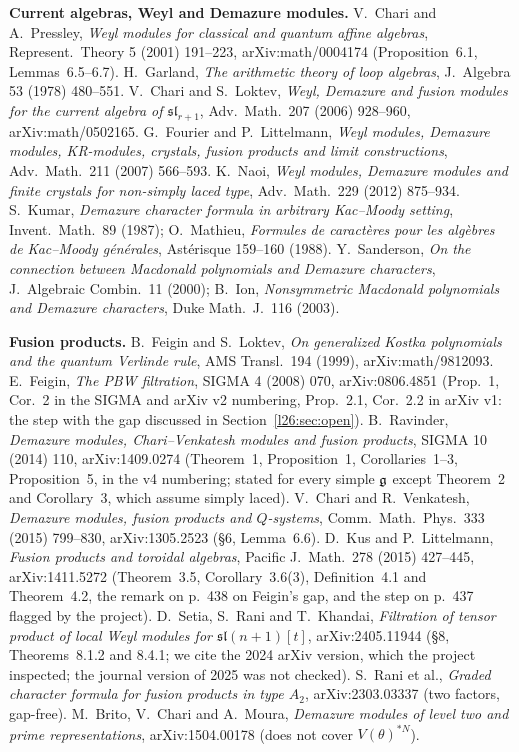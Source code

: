 \textbf{Current algebras, Weyl and Demazure modules.} V.~Chari and A.~Pressley, \emph{Weyl modules for classical and quantum affine
algebras}, Represent.\ Theory 5 (2001) 191--223, arXiv:math/0004174 (Proposition~6.1, Lemmas~6.5--6.7). H.~Garland, \emph{The arithmetic
theory of loop algebras}, J.\ Algebra 53 (1978) 480--551. V.~Chari and S.~Loktev, \emph{Weyl, Demazure and fusion modules for the current
algebra of $\mathfrak{sl}_{r+1}$}, Adv.\ Math.\ 207 (2006) 928--960, arXiv:math/0502165. G.~Fourier and P.~Littelmann, \emph{Weyl modules,
Demazure modules, KR-modules, crystals, fusion products and limit constructions}, Adv.\ Math.\ 211 (2007) 566--593. K.~Naoi, \emph{Weyl modules,
Demazure modules and finite crystals for non-simply laced type}, Adv.\ Math.\ 229 (2012) 875--934. S.~Kumar, \emph{Demazure character formula in
arbitrary Kac--Moody setting}, Invent.\ Math.\ 89 (1987); O.~Mathieu, \emph{Formules de caract\`eres pour les alg\`ebres de Kac--Moody
g\'en\'erales}, Ast\'erisque 159--160 (1988). Y.~Sanderson, \emph{On the connection between Macdonald polynomials and Demazure characters}, J.\
Algebraic Combin.\ 11 (2000); B.~Ion, \emph{Nonsymmetric Macdonald polynomials and Demazure characters}, Duke Math.\ J.\ 116 (2003).

\textbf{Fusion products.} B.~Feigin and S.~Loktev, \emph{On generalized Kostka polynomials and the quantum Verlinde rule}, AMS Transl.\ 194
(1999), arXiv:math/9812093. E.~Feigin, \emph{The PBW filtration}, SIGMA 4 (2008) 070, arXiv:0806.4851 (Prop.~1, Cor.~2 in the SIGMA and
arXiv v2 numbering, Prop.~2.1, Cor.~2.2 in arXiv v1: the step with the gap discussed in Section~\ref{l26:sec:open}). B.~Ravinder, \emph{Demazure modules, Chari--Venkatesh modules and fusion products}, SIGMA 10
(2014) 110, arXiv:1409.0274 (Theorem~1, Proposition~1, Corollaries~1--3, Proposition~5, in the v4 numbering; stated for every simple
$\mathfrak g$ except Theorem~2 and Corollary~3, which assume simply laced). V.~Chari and R.~Venkatesh, \emph{Demazure modules,
fusion products and $Q$-systems}, Comm.\ Math.\ Phys.\ 333 (2015) 799--830, arXiv:1305.2523 (\S6, Lemma~6.6). D.~Kus and P.~Littelmann, \emph{Fusion products and toroidal algebras}, Pacific J.\ Math.\ 278 (2015) 427--445, arXiv:1411.5272 (Theorem~3.5,
Corollary~3.6(3), Definition~4.1 and Theorem~4.2, the remark on p.~438 on Feigin's gap, and the step on p.~437 flagged by the project). D.~Setia, S.~Rani and T.~Khandai, \emph{Filtration of tensor product of local
Weyl modules for $\mathfrak{sl}(n+1)[t]$}, arXiv:2405.11944 (\S8, Theorems~8.1.2 and 8.4.1; we
cite the 2024 arXiv version, which the project inspected; the journal version of 2025 was not checked). S.~Rani et al., \emph{Graded character formula for fusion products in type $A_2$}, arXiv:2303.03337 (two factors, gap-free). M.~Brito,
V.~Chari and A.~Moura, \emph{Demazure modules of level two and prime representations}, arXiv:1504.00178 (does not cover $V(\theta)^{*N}$).

